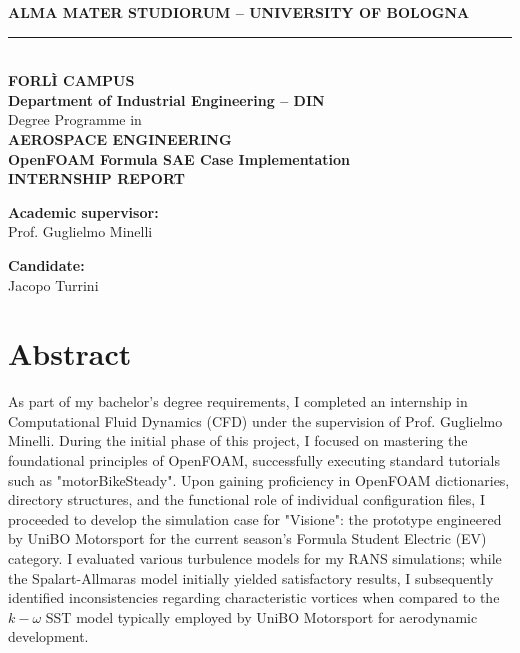 \documentclass[a4paper]{article}
\begin{document}
	
	\setcounter{page}{1}
	\begin{titlepage}
		\begin{center}
			\vspace*{-1.5cm}
			{\large \textbf{ALMA MATER STUDIORUM -- UNIVERSITY OF BOLOGNA}} \\[0.2cm]
			\rule{\textwidth}{0.4pt} \\[0.5cm] 
			
			{\Large \textbf{FORL\`I CAMPUS}} \\[0.5cm]
			{\large \textbf{Department of Industrial Engineering -- DIN}} \\[0.5cm]
			{\large Degree Programme in }\\
			{\large \textbf{AEROSPACE ENGINEERING}}\\[5cm] 
			{\huge \textbf{OpenFOAM Formula SAE Case Implementation}} \\[1cm]
			{\Large \textbf{INTERNSHIP REPORT}}
		\end{center}
		
		\vfill 
		
		\begin{minipage}[t]{0.47\textwidth}
			{\textbf{Academic supervisor:}}\\[0.2cm]
			{Prof. Guglielmo Minelli}
		\end{minipage}\hfill
		\begin{minipage}[t]{0.47\textwidth}\raggedleft
			{\textbf{Candidate:}}\\[0.2cm]
			{Jacopo Turrini}
		\end{minipage}
	\end{titlepage}
	
	\tableofcontents
	
	\newpage
	\listoffigures
	\newpage
	\listoftables
	\newpage
	
	\section*{Abstract}
	As part of my bachelor's degree requirements, I completed an internship in Computational Fluid Dynamics (CFD) under the supervision of Prof. Guglielmo Minelli.
	During the initial phase of this project, I focused on mastering the foundational principles of OpenFOAM, successfully executing standard tutorials such as "motorBikeSteady".
	Upon gaining proficiency in OpenFOAM dictionaries, directory structures, and the functional role of individual configuration files, I proceeded to develop the simulation case for "Visione": the prototype engineered by UniBO Motorsport for the current season's Formula Student Electric (EV) category.
	I evaluated various turbulence models for my RANS simulations; while the Spalart-Allmaras model initially yielded satisfactory results, I subsequently identified inconsistencies regarding characteristic vortices when compared to the $k-\omega$ SST model typically employed by UniBO Motorsport for aerodynamic development.
	\newpage
	
\end{document}
